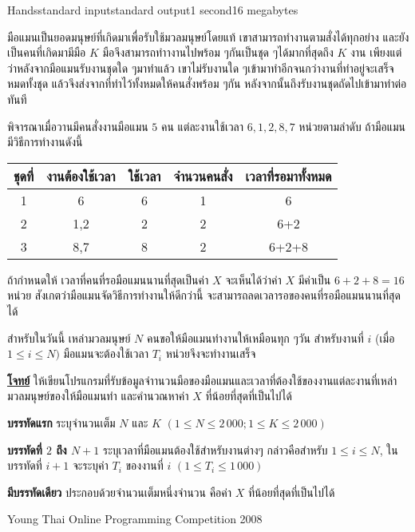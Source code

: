 \documentclass[11pt,a4paper]{article}
\begin{document}
\begin{problem}{Hands}{standard input}{standard output}{1 second}{16 megabytes}

มือแมนเป็นยอดมนุษย์ที่เกิดมาเพื่อรับใช้มวลมนุษย์โดยแท้ เขาสามารถทำงานตามสั่งได้ทุกอย่าง และยังเป็นคนที่เกิดมามีมือ $K$ มือจึงสามารถทำางานไปพร้อม ๆกันเป็นชุด ๆได้มากที่สุดถึง $K$ งาน เพียงแต่ว่าหลังจากมือแมนรับงานชุดใด ๆมาทำแล้ว เขาไม่รับงานใด ๆเข้ามาทำอีกจนกว่างานที่ทำอยู่จะเสร็จหมดทั้งชุด แล้วจึงส่งจากที่ทำไว้ทั้งหมดให้คนสั่งพร้อม ๆกัน หลังจากนั้นถึงรับงานชุดถัดไปเข้ามาทำต่อทันที

พิจารณาเมื่อวานมีคนสั่งงานมือแมน $5$ คน แต่ละงานใช้เวลา $6, 1, 2, 8, 7$ หน่วยตามลำดับ ถ้ามือแมนมีวิธีการทำงานดังนี้
\begin{center}
\begin{tabular}{|c|c|c|c|c|}
\hline
\textbf{ชุดที่}	&\textbf{งานต้องใช้เวล}า	&\textbf{ใช้เวลา}&	\textbf{จำนวนคนสั่ง}	&\textbf{เวลาที่รอมาทั้งหมด}\\
\hline 
\hline
1	&6	&6	&1	&6\\
\hline
2	&1,2	&2	&2	&6+2\\
\hline
3	&8,7	&8	&2	&6+2+8\\
\hline
\end{tabular}
\end{center}

ถ้ากำหนดให้ เวลาที่คนที่รอมือแมนนานที่สุดเป็นค่า $X$ จะเห็นได้ว่าค่า $X$ มีค่าเป็น $6+2+8 = 16$ หน่วย สังเกตว่ามือแมนจัดวิธีการทำงานให้ดีกว่านี้ จะสามารถลดเวลารอของคนที่รอมือแมนนานที่สุดได้

สำหรับในวันนี้ เหล่ามวลมนุษย์ $N$ คนขอให้มือแมนทำงานให้เหมือนทุก ๆวัน สำหรับงานที่ $i$ (เมื่อ $1 \leq i \leq N)$ มือแมนจะต้องใช้เวลา $T_i$ หน่วยจึงจะทำงานเสร็จ

\bigskip
\underline{\textbf{โจทย์}}  ให้เขียนโปรแกรมที่รับข้อมูลจำานวนมือของมือแมนและเวลาที่ต้องใช้ของงานแต่ละงานที่เหล่ามวลมนุษย์ของให้มือแมนทำ และคำนวณหาค่า $X$ ที่น้อยที่สุดที่เป็นไปได้

\InputFile

\textbf{บรรทัดแรก} ระบุจำนวนเต็ม $N$ และ $K$ $(1\leq N \leq 2\,000; 1 \leq K \leq 2\,000)$

\textbf{บรรทัดที่ $2$ ถึง $N+1$} ระบุเวลาที่มือแมนต้องใช้สำหรับงานต่างๆ กล่าวคือสำหรับ $1 \leq i \leq N$, ในบรรทัดที่ $i + 1$ จะระบุค่า $T_i$ ของงานที่ $i$ $(1 \leq T_i \leq 1\,000)$


\OutputFile

\textbf{มีบรรทัดเดียว} ประกอบด้วยจำนวนเต็มหนึ่งจำนวน คือค่า $X$ ที่น้อยที่สุดที่เป็นไปได้

\Examples

\begin{example}
%
\end{example}


\Source

Young Thai Online Programming Competition 2008

\end{problem}
\end{document}
